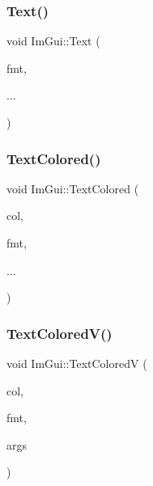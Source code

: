 \mbox{\label{namespace_im_gui_a9e7b83611fe441d54fad2effb4bf4965}} 
\subsubsection{\texorpdfstring{Text()}{Text()}}
{\footnotesize\ttfamily void Im\+Gui\+::\+Text (\begin{DoxyParamCaption}\item[{const char $\ast$}]{fmt,  }\item[{}]{... }\end{DoxyParamCaption})}

\mbox{\label{namespace_im_gui_a36ab8fcad68b26863d6e910755de04c2}} 
\subsubsection{\texorpdfstring{Text\+Colored()}{TextColored()}}
{\footnotesize\ttfamily void Im\+Gui\+::\+Text\+Colored (\begin{DoxyParamCaption}\item[{const \mbox{\hyperlink{struct_im_vec4}{Im\+Vec4}} \&}]{col,  }\item[{const char $\ast$}]{fmt,  }\item[{}]{... }\end{DoxyParamCaption})}

\mbox{\label{namespace_im_gui_a87c24ece994188a7145d8feecb4439ed}} 
\subsubsection{\texorpdfstring{Text\+Colored\+V()}{TextColoredV()}}
{\footnotesize\ttfamily void Im\+Gui\+::\+Text\+ColoredV (\begin{DoxyParamCaption}\item[{const \mbox{\hyperlink{struct_im_vec4}{Im\+Vec4}} \&}]{col,  }\item[{const char $\ast$}]{fmt,  }\item[{va\+\_\+list}]{args }\end{DoxyParamCaption})}

